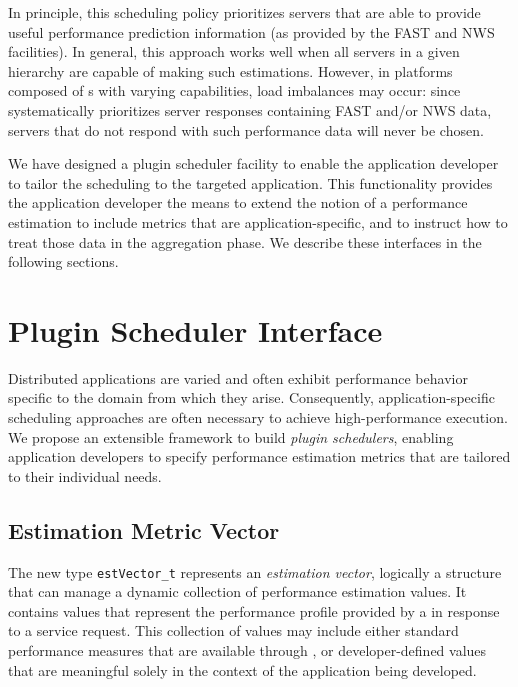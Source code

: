 In principle, this scheduling policy prioritizes servers that are able
to provide useful performance prediction information (as provided by
the FAST and NWS facilities).  In general, this approach works well
when all servers in a given \diet hierarchy are capable of making such
estimations.  However, in platforms composed of {\sed}s with varying
capabilities, load imbalances may occur: since \diet systematically
prioritizes server responses containing FAST and/or NWS data, servers
that do not respond with such performance data will never be
chosen.

We have designed a plugin scheduler facility to
enable the application developer to tailor the \diet scheduling to the
targeted application.
This functionality provides
the application developer the means to extend the notion of a
performance estimation to include metrics that are
application-specific, and to instruct \diet how to treat those data in
the aggregation phase.
We describe these interfaces in the following sections.


\section{Plugin Scheduler Interface}

Distributed applications are varied and often exhibit performance
behavior specific to the domain from which they arise.  Consequently,
application-specific scheduling approaches are often necessary to
achieve high-performance execution.  We propose an extensible
framework to build
\emph{plugin schedulers}, enabling application developers to specify
performance estimation metrics that are tailored to their individual
needs.


\subsection{Estimation Metric Vector}\label{sect:estvector}

The new type \texttt{estVector\_t} represents an
\emph{estimation vector}, logically a structure that can manage a
dynamic collection of performance estimation values.  It contains
values that represent the performance profile provided by a
{\sed} in response to a \diet service request.  This collection of values
may include either standard performance measures that are available
through \diet, or developer-defined values that are meaningful solely in
the context of the application being developed.

